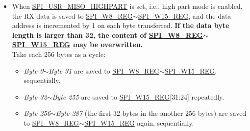\documentclass[main\_\_EN.tex]{subfiles}
\begin{document}
\begin{itemize}
\begin{itemize}
        \textbf{For instance:} to receive 258 bytes (\emph{Byte 0}$\sim$\emph{Byte 257}), the data is saved to the registers as follows:
        \begin{itemize}
            \item The first 64 bytes (\emph{Byte 0}$\sim$\emph{Byte 63}) are saved to \hyperref[regdesc:SPIW0REG]{SPI\_W0\_REG}$\sim$\hyperref[regdesc:SPIW15REG]{SPI\_W15\_REG}, sequentially.
            \item \emph{Byte 64}$\sim$\emph{Byte 255} are saved to \hyperref[regdesc:SPIW15REG]{SPI\_W15\_REG}[31:24] repeatedly.
            \item The other bytes (\emph{Byte 256} and \emph{Byte 257}) are saved to \hyperref[regdesc:SPIW0REG]{SPI\_W0\_REG}[7:0] and \hyperref[regdesc:SPIW0REG]{SPI\_W0\_REG}[15:8] again, sequentially. The logic is:
            \begin{itemize}
                \item The address to save \emph{Byte 256} is the result of (256 \% 64 = 0), i.e., \hyperref[regdesc:SPIW0REG]{SPI\_W0\_REG}[7:0].
                \item The address to save \emph{Byte 257} is the result of (257 \% 64 = 1), i.e., \hyperref[regdesc:SPIW0REG]{SPI\_W0\_REG}[15:8].
            \end{itemize}
        \end{itemize}

        \item When \hyperref[fielddesc:SPIUSRMISOHIGHPART]{SPI\_USR\_MISO\_HIGHPART} is set, i.e., high part mode is enabled, the RX data is saved to \hyperref[regdesc:SPIW8REG]{SPI\_W8\_REG}$\sim$\hyperref[regdesc:SPIW15REG]{SPI\_W15\_REG}, and the data address is incremented by 1 on each byte transferred. \textbf{If the data byte length is larger than 32, the content of \hyperref[regdesc:SPIW8REG]{SPI\_W8\_REG}$\sim$\hyperref[regdesc:SPIW15REG]{SPI\_W15\_REG} may be overwritten.} \\
        Take each 256 bytes as a cycle:
        \begin{itemize}
            \item \emph{Byte 0}$\sim$\emph{Byte 31} are saved to \hyperref[regdesc:SPIW8REG]{SPI\_W8\_REG}$\sim$\hyperref[regdesc:SPIW15REG]{SPI\_W15\_REG}, sequentially.
            \item \emph{Byte 32}$\sim$\emph{Byte 255} are saved to \hyperref[regdesc:SPIW15REG]{SPI\_W15\_REG}[31:24] repeatedly.
            \item \emph{Byte 256}$\sim$\emph{Byte 287} (the first 32 bytes in the another 256 bytes) are saved to \hyperref[regdesc:SPIW8REG]{SPI\_W8\_REG}$\sim$\hyperref[regdesc:SPIW15REG]{SPI\_W15\_REG} again, sequentially.
        \end{itemize}


\end{itemize}
\end{itemize}
\end{document}
